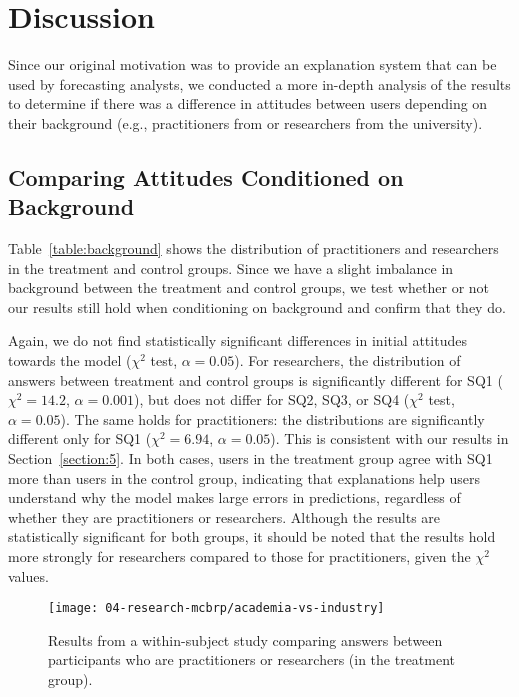 
\section{Discussion}
\label{section:6}
Since our original motivation was to provide an explanation system that can be used by forecasting analysts, we conducted a more in-depth analysis of the results to determine if there was a difference in attitudes between users depending on their background (e.g., practitioners from \OurCompany{} or researchers from the university). 




\subsection{Comparing Attitudes Conditioned on Background}
\label{section:conditioning}
Table~\ref{table:background} shows the distribution of practitioners and researchers in the treatment and control groups. 
Since we have a slight imbalance in background between the treatment and control groups, we test whether or not our results still hold when conditioning on background and confirm that they do. 



Again, we do not find statistically significant differences in initial attitudes towards the model ($\chi^{2}$ test, $\alpha = 0.05$). 
For researchers, the distribution of answers between treatment and control groups is significantly different for SQ1 ($\chi^{2} = 14.2$, $\alpha = 0.001$), but does not differ for SQ2, SQ3, or SQ4 ($\chi^{2}$ test, $\alpha = 0.05$). 
The same holds for practitioners: the distributions are significantly different only for SQ1 ($\chi^{2} = 6.94$, $\alpha = 0.05$). 
This is consistent with our results in Section~\ref{section:5}. 
In both cases, users in the treatment group agree with SQ1 more than users in the control group, indicating that \OurMethod{} explanations help users understand why the model makes large errors in predictions, regardless of whether they are practitioners or researchers.  
Although the results are statistically significant for both groups, it should be noted that the results hold more strongly for researchers compared to those for practitioners, given the $\chi^{2}$ values. 

\begin{figure}[t]
 \centering
 \texttt{[image: 04-research-mcbrp/academia-vs-industry]}
  \caption{Results from a within-subject study comparing answers between participants who are practitioners or researchers (in the treatment group).}
 \label{fig:aca-vs-ind}
\end{figure}

